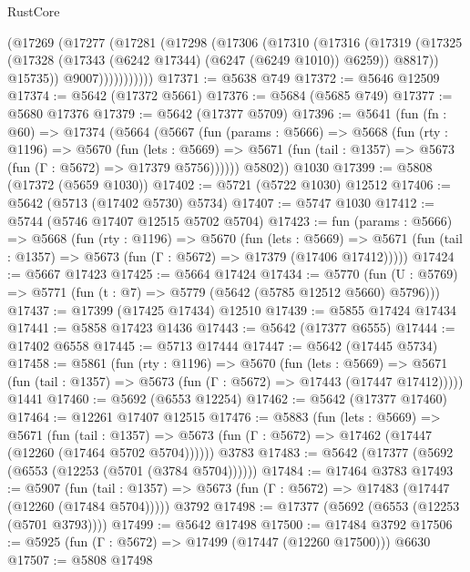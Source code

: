\begin{lexlean}{RustCore}
\begin{coremodule}
                (@17269
                  (@17277
                    (@17281
                      (@17298
                        (@17306
                          (@17310
                            (@17316
                              (@17319
                                (@17325
                                  (@17328 (@17343 (@6242 @17344) (@6247 (@6249 @1010)) @6259))
                                  @8817))
                              @15735))
                          @9007)))))))))))
@17371 := @5638 @749
@17372 := @5646 @12509
@17374 := @5642 (@17372 @5661)
@17376 := @5684 (@5685 @749)
@17377 := @5680 @17376
@17379 := @5642 (@17377 @5709)
@17396 := @5641
    (fun (fn : @60) =>
    @17374
      (@5664
        (@5667
          (fun (params : @5666) =>
          @5668
            (fun (rty : @1196) =>
            @5670
              (fun (lets : @5669) =>
              @5671 (fun (tail : @1357) => @5673 (fun (Γ : @5672) => @17379 @5756))))))
        @5802))
    @1030
@17399 := @5808 (@17372 (@5659 @1030))
@17402 := @5721 (@5722 @1030) @12512
@17406 := @5642 (@5713 (@17402 @5730) @5734)
@17407 := @5747 @1030
@17412 := @5744 (@5746 @17407 @12515 @5702 @5704)
@17423 := fun (params : @5666) =>
  @5668
    (fun (rty : @1196) =>
    @5670
      (fun (lets : @5669) =>
      @5671 (fun (tail : @1357) => @5673 (fun (Γ : @5672) => @17379 (@17406 @17412)))))
@17424 := @5667 @17423
@17425 := @5664 @17424
@17434 := @5770
    (fun (U : @5769) => @5771 (fun (t : @7) => @5779 (@5642 (@5785 @12512 @5660) @5796)))
@17437 := @17399 (@17425 @17434) @12510
@17439 := @5855 @17424 @17434
@17441 := @5858 @17423 @1436
@17443 := @5642 (@17377 @6555)
@17444 := @17402 @6558
@17445 := @5713 @17444
@17447 := @5642 (@17445 @5734)
@17458 := @5861
    (fun (rty : @1196) =>
    @5670
      (fun (lets : @5669) =>
      @5671 (fun (tail : @1357) => @5673 (fun (Γ : @5672) => @17443 (@17447 @17412)))))
    @1441
@17460 := @5692 (@6553 @12254)
@17462 := @5642 (@17377 @17460)
@17464 := @12261 @17407 @12515
@17476 := @5883
    (fun (lets : @5669) =>
    @5671
      (fun (tail : @1357) =>
      @5673 (fun (Γ : @5672) => @17462 (@17447 (@12260 (@17464 @5702 @5704))))))
    @3783
@17483 := @5642 (@17377 (@5692 (@6553 (@12253 (@5701 (@3784 @5704))))))
@17484 := @17464 @3783
@17493 := @5907
    (fun (tail : @1357) => @5673 (fun (Γ : @5672) => @17483 (@17447 (@12260 (@17484 @5704)))))
    @3792
@17498 := @17377 (@5692 (@6553 (@12253 (@5701 @3793))))
@17499 := @5642 @17498
@17500 := @17484 @3792
@17506 := @5925 (fun (Γ : @5672) => @17499 (@17447 (@12260 @17500))) @6630
@17507 := @5808 @17498

\end{coremodule}
\end{lexlean}
